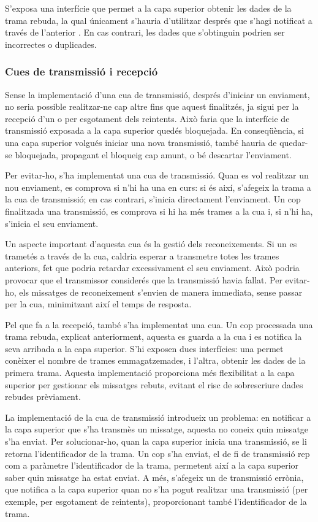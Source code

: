 \documentclass{tfgitic}[2024/07/01]
\begin{document}
S'exposa una interfície que permet a la capa superior obtenir les dades de la trama rebuda, la qual únicament s'hauria d'utilitzar després que s'hagi notificat a través de l'anterior . En cas contrari, les dades que s'obtinguin podrien ser incorrectes o duplicades.
\subsubsection{Cues de transmissió i recepció}
Sense la implementació d'una cua de transmissió, després d'iniciar un enviament, no seria possible realitzar-ne cap altre fins que aquest finalitzés, ja sigui per la recepció d’un  o per esgotament dels reintents. Això faria que la interfície de transmissió exposada a la capa superior quedés bloquejada. En conseqüència, si una capa superior volgués iniciar una nova transmissió, també hauria de quedar-se bloquejada, propagant el bloqueig cap amunt, o bé descartar l’enviament.

Per evitar-ho, s'ha implementat una cua de transmissió. Quan es vol realitzar un nou enviament, es comprova si n'hi ha una en curs: si és així, s'afegeix la trama a la cua de transmissió; en cas contrari, s'inicia directament l'enviament. Un cop finalitzada una transmissió, es comprova si hi ha més trames a la cua i, si n'hi ha, s'inicia el seu enviament.

Un aspecte important d’aquesta cua és la gestió dels reconeixements. Si un  es trametés a través de la cua, caldria esperar a transmetre totes les trames anteriors, fet que podria retardar excessivament el seu enviament. Això podria provocar que el transmissor considerés que la transmissió havia fallat. Per evitar-ho, els missatges de reconeixement s’envien de manera immediata, sense passar per la cua, minimitzant així el temps de resposta.

Pel que fa a la recepció, també s’ha implementat una cua. Un cop processada una trama rebuda, explicat anteriorment, aquesta es guarda a la cua i es notifica la seva arribada a la capa superior. S’hi exposen dues interfícies: una permet conèixer el nombre de trames emmagatzemades, i l’altra, obtenir les dades de la primera trama. Aquesta implementació proporciona més flexibilitat a la capa superior per gestionar els missatges rebuts, evitant el risc de sobrescriure dades rebudes prèviament.

La implementació de la cua de transmissió introdueix un problema: en notificar a la capa superior que s'ha transmès un missatge, aquesta no coneix quin missatge s'ha enviat. Per solucionar-ho, quan la capa superior inicia una transmissió, se li retorna l'identificador de la trama. Un cop s'ha enviat, el  de fi de transmissió rep com a paràmetre l'identificador de la trama, permetent així a la capa superior saber quin missatge ha estat enviat. A més, s'afegeix un  de transmissió errònia, que notifica a la capa superior quan no s'ha pogut realitzar una transmissió (per exemple, per esgotament de reintents), proporcionant també l'identificador de la trama.
\end{document}
